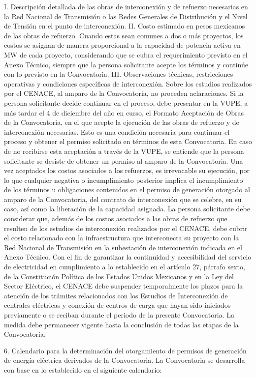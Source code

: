I.	Descripción detallada de las obras de interconexión y de refuerzo necesarias en la Red Nacional de Transmisión o las Redes Generales de Distribución y el Nivel de Tensión en el punto de interconexión.
II.	Costo estimado en pesos mexicanos de las obras de refuerzo. Cuando estas sean comunes a dos o más proyectos, los costos se asignan de manera proporcional a la capacidad de potencia activa en MW de cada proyecto, considerando que se cubra el requerimiento previsto en el Anexo Técnico, siempre que la persona solicitante acepte los términos y continúe con lo previsto en la Convocatoria.
III.	Observaciones técnicas, restricciones operativas y condiciones específicas de interconexión.
Sobre los estudios realizados por el CENACE, al amparo de la Convocatoria, no proceden aclaraciones.
Si la persona solicitante decide continuar en el proceso, debe presentar en la VUPE, a más tardar el 4 de diciembre del año en curso, el Formato Aceptación de Obras de la Convocatoria, en el que acepte la ejecución de las obras de refuerzo y de interconexión necesarias. Esto es una condición necesaria para continuar el proceso y obtener el permiso solicitado en términos de esta Convocatoria.
En caso de no recibirse esta aceptación a través de la VUPE, se entiende que la persona solicitante se desiste de obtener un permiso al amparo de la Convocatoria.
Una vez aceptados los costos asociados a los refuerzos, es irrevocable su ejecución, por lo que cualquier negativa o incumplimiento posterior implica el incumplimiento de los términos u obligaciones contenidos en el permiso de generación otorgado al amparo de la Convocatoria, del contrato de interconexión que se celebre, en su caso, así como la liberación de la capacidad asignada.
La persona solicitante debe considerar que, además de los costos asociados a las obras de refuerzo que resulten de los estudios de interconexión realizados por el CENACE, debe cubrir el costo relacionado con la infraestructura que interconecta su proyecto con la Red Nacional de Transmisión en la subestación de interconexión indicada en el Anexo Técnico.
Con el fin de garantizar la continuidad y accesibilidad del servicio de electricidad en cumplimiento a lo establecido en el artículo 27, párrafo sexto, de la Constitución Política de los Estados Unidos Mexicanos y en la Ley del Sector Eléctrico, el CENACE debe suspender temporalmente los plazos para la atención de los trámites relacionados con los Estudios de Interconexión de centrales eléctricas y conexión de centros de carga que hayan sido iniciados previamente o se reciban durante el periodo de la presente Convocatoria. La medida debe permanecer vigente hasta la conclusión de todas las etapas de la Convocatoria.\par
6. Calendario para la determinación del otorgamiento de permisos de generación de energía eléctrica derivados de la Convocatoria.
La Convocatoria se desarrolla con base en lo establecido en el siguiente calendario:

